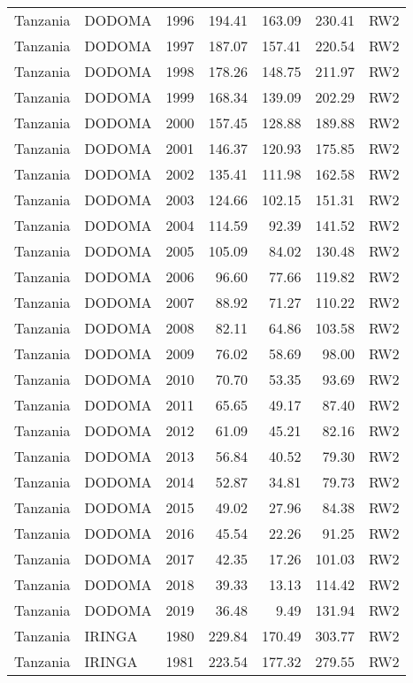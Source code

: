 \begin{longtable}{lllrrrl}
  Tanzania & DODOMA & 1996 & 194.41 & 163.09 & 230.41 & RW2 \\ 
  Tanzania & DODOMA & 1997 & 187.07 & 157.41 & 220.54 & RW2 \\ 
  Tanzania & DODOMA & 1998 & 178.26 & 148.75 & 211.97 & RW2 \\ 
  Tanzania & DODOMA & 1999 & 168.34 & 139.09 & 202.29 & RW2 \\ 
  Tanzania & DODOMA & 2000 & 157.45 & 128.88 & 189.88 & RW2 \\ 
  Tanzania & DODOMA & 2001 & 146.37 & 120.93 & 175.85 & RW2 \\ 
  Tanzania & DODOMA & 2002 & 135.41 & 111.98 & 162.58 & RW2 \\ 
  Tanzania & DODOMA & 2003 & 124.66 & 102.15 & 151.31 & RW2 \\ 
  Tanzania & DODOMA & 2004 & 114.59 & 92.39 & 141.52 & RW2 \\ 
  Tanzania & DODOMA & 2005 & 105.09 & 84.02 & 130.48 & RW2 \\ 
  Tanzania & DODOMA & 2006 & 96.60 & 77.66 & 119.82 & RW2 \\ 
  Tanzania & DODOMA & 2007 & 88.92 & 71.27 & 110.22 & RW2 \\ 
  Tanzania & DODOMA & 2008 & 82.11 & 64.86 & 103.58 & RW2 \\ 
  Tanzania & DODOMA & 2009 & 76.02 & 58.69 & 98.00 & RW2 \\ 
  Tanzania & DODOMA & 2010 & 70.70 & 53.35 & 93.69 & RW2 \\ 
  Tanzania & DODOMA & 2011 & 65.65 & 49.17 & 87.40 & RW2 \\ 
  Tanzania & DODOMA & 2012 & 61.09 & 45.21 & 82.16 & RW2 \\ 
  Tanzania & DODOMA & 2013 & 56.84 & 40.52 & 79.30 & RW2 \\ 
  Tanzania & DODOMA & 2014 & 52.87 & 34.81 & 79.73 & RW2 \\ 
  Tanzania & DODOMA & 2015 & 49.02 & 27.96 & 84.38 & RW2 \\ 
  Tanzania & DODOMA & 2016 & 45.54 & 22.26 & 91.25 & RW2 \\ 
  Tanzania & DODOMA & 2017 & 42.35 & 17.26 & 101.03 & RW2 \\ 
  Tanzania & DODOMA & 2018 & 39.33 & 13.13 & 114.42 & RW2 \\ 
  Tanzania & DODOMA & 2019 & 36.48 & 9.49 & 131.94 & RW2 \\ 
  Tanzania & IRINGA & 1980 & 229.84 & 170.49 & 303.77 & RW2 \\ 
  Tanzania & IRINGA & 1981 & 223.54 & 177.32 & 279.55 & RW2 \\ 

\end{longtable}
